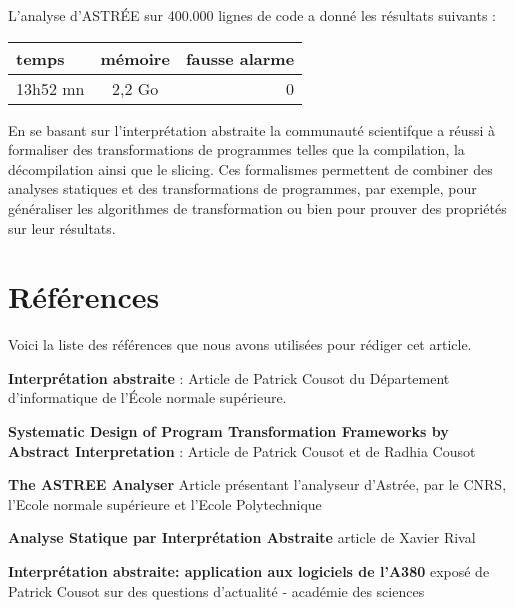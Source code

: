 \documentclass[french]{report}
\begin{document}
L'analyse d'ASTRÉE sur 400.000 lignes de code a donné les résultats suivants : \\
\begin{center}
\begin{tabular}{|l|c|r|}
  \hline
  temps & mémoire & fausse alarme \\
  \hline
  13h52 mn & 2,2 Go & 0 \\
  \hline
\end{tabular}
\end{center}

En se basant sur l'interprétation abstraite la communauté scientifque a réussi à formaliser des transformations de programmes telles que la compilation, la décompilation ainsi que le slicing. Ces formalismes permettent de combiner des analyses statiques et des transformations de programmes, par exemple, pour généraliser les algorithmes de transformation ou bien pour prouver des propriétés sur leur résultats.


\section{Références}
Voici la liste des références que nous avons utilisées pour rédiger cet article.
\begin{description}
    \item \textbf{Interprétation abstraite} : Article de Patrick Cousot du
    Département d’informatique de l'École normale supérieure.
    \item \textbf{Systematic Design of Program Transformation Frameworks by Abstract Interpretation} :
    Article de Patrick Cousot et de Radhia Cousot
    \item \textbf{The ASTREE Analyser} Article présentant l'analyseur d'Astrée, par le CNRS, l'Ecole normale supérieure
    et l'Ecole Polytechnique
    \item \textbf{Analyse Statique par Interprétation
Abstraite} article de Xavier Rival
  \item \textbf{Interprétation abstraite: application aux logiciels de l'A380} exposé de Patrick Cousot sur des questions d'actualité - académie des sciences 
\end{description}
\end{document}
